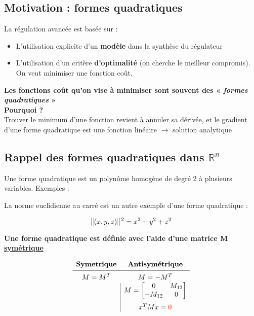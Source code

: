\documentclass[document.tex]{subfiles}
\begin{document}

\subsection{Motivation : formes quadratiques}


La régulation avancée est basée sur :
\begin{itemize}
\item L'utilisation explicite d'un \textbf{modèle} dans la synthèse du régulateur
\item L'utilisation d'un critère \textbf{d'optimalité} (on cherche le meilleur compromis). On veut minimiser une fonction coût.\\
\end{itemize}

\textbf{Les fonctions coût qu'on vise à minimiser sont souvent des « \textit{formes quadratiques} »}\\

\textbf{Pourquoi ?}\\
Trouver le minimum d'une fonction revient à annuler sa dérivée, et le gradient d'une forme quadratique est une fonction linéaire $\rightarrow$ solution analytique

\subsection{Rappel des formes quadratiques dans $\mathbb{R}^n$}

Une forme quadratique est un polynôme homogène de degré 2 à plusieurs variables. Exemples :


La norme euclidienne au carré est un autre exemple d'une forme quadratique :

\begin{equation}
\vline \; \vline (x,y,z) \vline \; \vline^{\;2} = x^2 + y^2 + z^2
\end{equation}

\textbf{Une forme quadratique est définie avec l'aide d'une matrice M \underline{symétrique}}

\begin{equation}
\begin{array}{c | c}
\text{\textbf{Symetrique}} & \text{\textbf{Antisymétrique}} \\[2pt] \hline \; \\[-8pt] 
M = M^T & M = -M^T \\
\; & M = \begin{bmatrix} 0 & M_{12} \\ -M_{12} & 0 \end{bmatrix} \\[12pt]
\; &  x^TMx = \textcolor{red}{0}
\end{array}
\end{equation}
\end{document}
